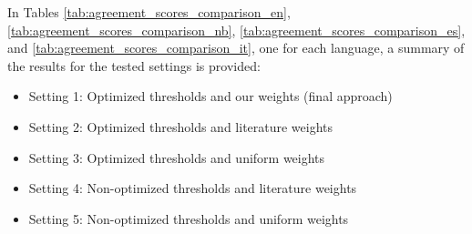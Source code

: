 \documentclass[preprint,12pt,authoryear]{elsarticle}
\begin{document}
In Tables \ref{tab:agreement_scores_comparison_en}, \ref{tab:agreement_scores_comparison_nb}, \ref{tab:agreement_scores_comparison_es}, and \ref{tab:agreement_scores_comparison_it}, one for each language, a summary of the results for the tested settings is provided:

\begin{itemize}
    \item Setting 1: Optimized thresholds and our weights (final approach)
    \item Setting 2: Optimized thresholds and literature weights
    \item Setting 3: Optimized thresholds and uniform weights
    \item Setting 4: Non-optimized thresholds and literature weights
    \item Setting 5: Non-optimized thresholds and uniform weights
\end{itemize}

\end{document}
